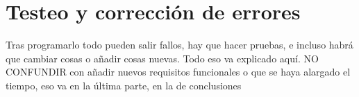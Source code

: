\chapter{Testeo y corrección de errores}

{\color{red} Tras programarlo todo pueden salir fallos, hay que hacer pruebas, e incluso habrá que cambiar cosas o añadir cosas nuevas. Todo eso va explicado aquí. NO CONFUNDIR con añadir nuevos requisitos funcionales o que se haya alargado el tiempo, eso va en la última parte, en la de conclusiones}